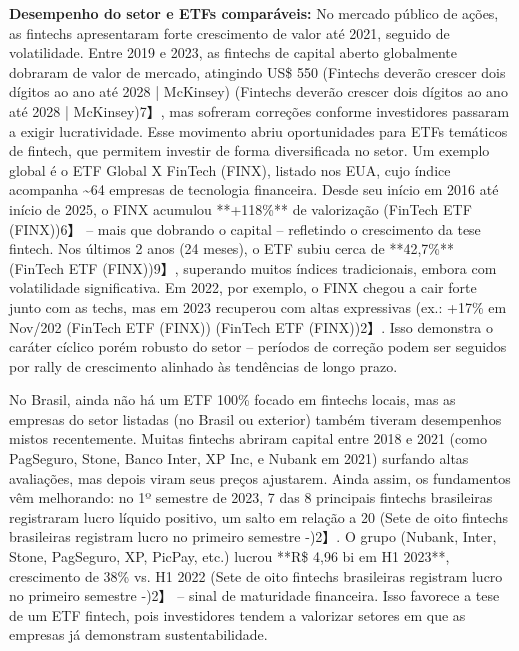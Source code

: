 \documentclass[12pt]{article}
\begin{document}
\textbf{Desempenho do setor e ETFs comparáveis:} No mercado público de ações, as fintechs apresentaram forte crescimento de valor até 2021, seguido de volatilidade. Entre 2019 e 2023, as fintechs de capital aberto globalmente dobraram de valor de mercado, atingindo US\$ 550 (Fintechs deverão crescer dois dígitos ao ano até 2028 | McKinsey) (Fintechs deverão crescer dois dígitos ao ano até 2028 | McKinsey)7】, mas sofreram correções conforme investidores passaram a exigir lucratividade. Esse movimento abriu oportunidades para ETFs temáticos de fintech, que permitem investir de forma diversificada no setor. Um exemplo global é o ETF Global X FinTech (FINX), listado nos EUA, cujo índice acompanha \textasciitilde64 empresas de tecnologia financeira. Desde seu início em 2016 até início de 2025, o FINX acumulou **+118\%** de valorização (FinTech ETF (FINX))6】 – mais que dobrando o capital – refletindo o crescimento da tese fintech. Nos últimos 2 anos (24 meses), o ETF subiu cerca de **42,7\%** (FinTech ETF (FINX))9】, superando muitos índices tradicionais, embora com volatilidade significativa. Em 2022, por exemplo, o FINX chegou a cair forte junto com as techs, mas em 2023 recuperou com altas expressivas (ex.: +17\% em Nov/202 (FinTech ETF (FINX)) (FinTech ETF (FINX))2】. Isso demonstra o caráter cíclico porém robusto do setor – períodos de correção podem ser seguidos por rally de crescimento alinhado às tendências de longo prazo.

No Brasil, ainda não há um ETF 100\% focado em fintechs locais, mas as empresas do setor listadas (no Brasil ou exterior) também tiveram desempenhos mistos recentemente. Muitas fintechs abriram capital entre 2018 e 2021 (como PagSeguro, Stone, Banco Inter, XP Inc, e Nubank em 2021) surfando altas avaliações, mas depois viram seus preços ajustarem. Ainda assim, os fundamentos vêm melhorando: no 1º semestre de 2023, 7 das 8 principais fintechs brasileiras registraram lucro líquido positivo, um salto em relação a 20 (Sete de oito fintechs brasileiras registram lucro no primeiro semestre -)2】. O grupo (Nubank, Inter, Stone, PagSeguro, XP, PicPay, etc.) lucrou **R\$ 4,96 bi em H1 2023**, crescimento de 38\% vs. H1 2022 (Sete de oito fintechs brasileiras registram lucro no primeiro semestre -)2】 – sinal de maturidade financeira. Isso favorece a tese de um ETF fintech, pois investidores tendem a valorizar setores em que as empresas já demonstram sustentabilidade.
\end{document}
